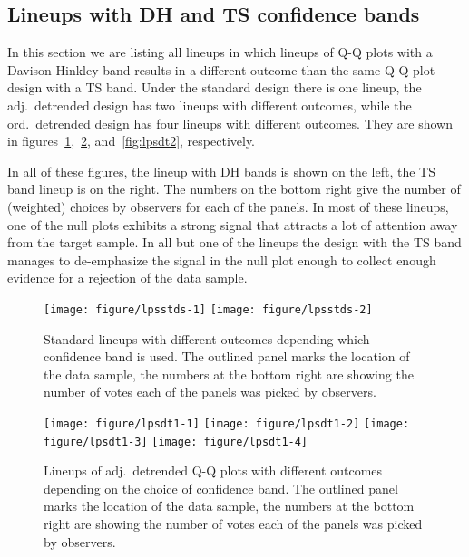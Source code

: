 \documentclass[12pt]{article}\usepackage[]{graphicx}\usepackage[]{color}
\newenvironment{knitrout}{}{} %
\newcommand{\hh}[1]{{\color{magenta} #1}}
\newcommand{\HH}[1]{{\color{orange} #1}}
\begin{document}
\begin{appendix}
\section{Lineups with DH and TS confidence bands}\label{sec:lplist}

%
In this section we are listing all lineups in which lineups of Q-Q plots with a Davison-Hinkley band results in a different outcome than the same Q-Q plot design with a TS band. 
Under the standard design there is one lineup, the \HH{adj.\ detrended}  design has two lineups with different outcomes, while the \HH{ord.\ detrended} design has four lineups with different outcomes. They are shown in figures~\ref{fig:lpsstds},~\ref{fig:lpsdt1}, and~\ref{fig:lpsdt2}, respectively. 

\hh{In all of these figures, the lineup with DH bands is shown on the left, the TS band lineup is on the right. The numbers on the bottom right give the number of (weighted) choices by observers for each of the panels. In most of these lineups, one of the null plots exhibits a strong signal that attracts a lot of attention away from the target sample. In all but one of the lineups the design with the TS band manages to de-emphasize the signal in the null plot enough to collect enough evidence for a rejection of the data sample. }
\begin{figure}
\centering
\begin{knitrout}
\color{fgcolor}
\texttt{[image: figure/lpsstds-1]} 
\texttt{[image: figure/lpsstds-2]} 

\end{knitrout}
\caption{\label{fig:lpsstds} Standard lineups with different outcomes depending which confidence band is used. The outlined panel marks the location of the data sample, the numbers at the bottom right are showing the number of votes each of the panels was picked by observers.  }
\end{figure}
\afterpage{\clearpage}


\begin{figure}
\centering
\begin{knitrout}
\color{fgcolor}
\texttt{[image: figure/lpsdt1-1]} 
\texttt{[image: figure/lpsdt1-2]} 
\texttt{[image: figure/lpsdt1-3]} 
\texttt{[image: figure/lpsdt1-4]} 

\end{knitrout}
\caption{\label{fig:lpsdt1} Lineups of adj.\ detrended Q-Q plots with different outcomes depending on the choice of confidence band. The outlined panel marks the location of the data sample, the numbers at the bottom right are showing the number of votes each of the panels was picked by observers.  }
\end{figure}
\afterpage{\clearpage}




\end{appendix}
\end{document}
